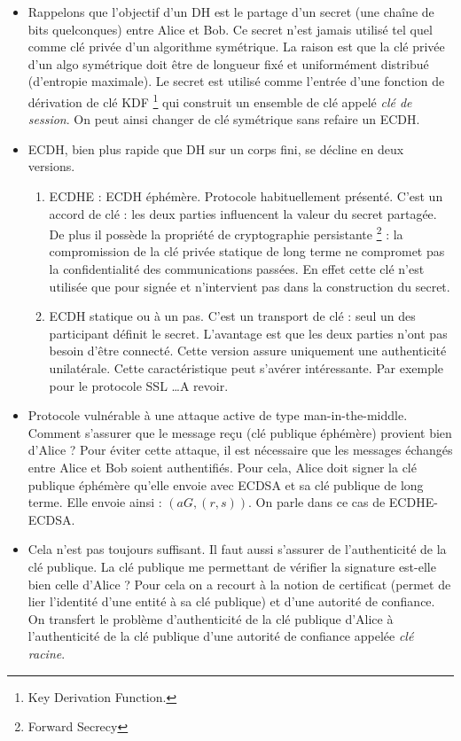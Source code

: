 \begin{itemize}[label=$\bullet$]
    \item Rappelons que l'objectif d'un DH est le partage d'un secret (une chaîne de bits quelconques) entre Alice et Bob. Ce secret n'est jamais utilisé tel quel comme clé privée d'un algorithme symétrique. La raison est que la clé privée d'un algo symétrique doit être de longueur fixé et uniformément distribué (d'entropie maximale). Le secret est utilisé comme l'entrée d'une fonction de dérivation de clé KDF \footnote{Key Derivation Function.} qui construit un ensemble de clé appelé \emph{clé de session}. On peut ainsi changer de clé symétrique sans refaire un ECDH.
    
    \item ECDH, bien plus rapide que DH sur un corps fini, se décline en deux versions. 
        \begin{enumerate}
            \item ECDHE : ECDH éphémère. Protocole habituellement présenté. C'est un accord de clé : les deux parties influencent la valeur du secret partagée. De plus il possède la propriété de cryptographie persistante \footnote{Forward Secrecy} : la compromission de la clé privée statique de long terme ne compromet pas la confidentialité des communications passées. En effet cette clé n'est utilisée que pour signée et n'intervient pas dans la construction du secret. 
            \item ECDH statique ou à un pas. C'est un transport de clé : seul un des participant définit le secret. L'avantage est que les deux parties n'ont pas besoin d'être connecté. Cette version assure uniquement une authenticité unilatérale. Cette caractéristique peut s'avérer intéressante. Par exemple pour le protocole SSL \ldots A revoir.
        \end{enumerate}
        
    \item Protocole vulnérable à une attaque active de type man-in-the-middle. Comment s'assurer que le message reçu (clé publique éphémère) provient bien d'Alice ? Pour éviter cette attaque, il est nécessaire que les messages échangés entre Alice et Bob soient authentifiés. Pour cela, Alice doit signer la clé publique éphémère qu'elle envoie avec ECDSA et sa clé publique de long terme. Elle envoie ainsi : $(aG, (r, s))$. On parle dans ce cas de ECDHE-ECDSA.
    
    \item Cela n'est pas toujours suffisant. Il faut aussi s'assurer de l'authenticité de la clé publique. La clé publique me permettant de vérifier la signature est-elle bien celle d'Alice ? Pour cela on a recourt à la notion de certificat (permet de lier l'identité d'une entité à sa clé publique) et d'une autorité de confiance. On transfert le problème d'authenticité de la clé publique d'Alice à l'authenticité de la clé publique d'une autorité de confiance appelée \emph{clé racine}.
    

\end{itemize}
